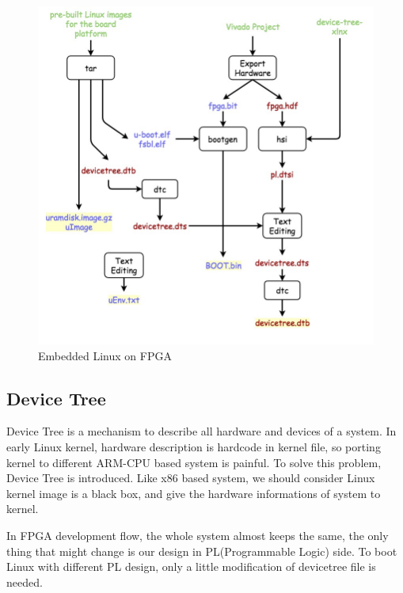 \begin{figure}[!htb]
  \centering
  \includegraphics[scale=0.5]{images/embedded_linux.jpg}
  \caption[Embedded Linux on FPGA]{Embedded Linux on FPGA}
  \label{fig:Embedded Linux on FPGA}
\end{figure}



\subsection{Device Tree}
\label{subsec:Device Tree}

Device Tree is a mechanism to describe all hardware and devices of a system. In early Linux 
kernel, hardware description is hardcode in kernel file, so porting kernel to different
ARM-CPU based system is painful. To solve this problem, Device Tree is introduced. 
Like x86 based system, we should consider Linux kernel image is a black box, and give the 
hardware informations of system to kernel.
%

In FPGA development flow, the whole system almost keeps the same, the only thing that might change 
is our design in PL(Programmable Logic) side. To boot Linux with different PL design, only 
a little modification of devicetree file is needed.     


